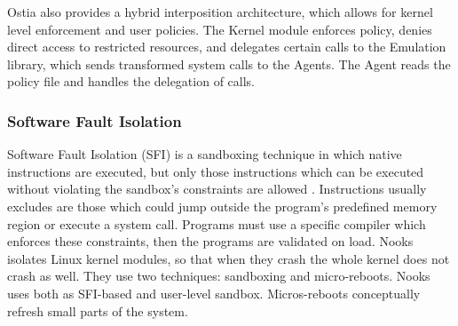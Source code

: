 Ostia also provides a hybrid interposition architecture, which allows for kernel level enforcement and user policies. 
The Kernel module enforces policy, denies direct access to restricted resources, and delegates certain calls to 
the Emulation library, which sends transformed system calls to the Agents. The Agent reads the policy file and 
handles the delegation of calls.


\subsubsection{Software Fault Isolation}

Software Fault Isolation (SFI) is a sandboxing technique in which native instructions are executed, but only those instructions 
which can be executed without violating the sandbox's constraints are allowed \cite{SFI:93}. Instructions usually excludes 
are those which could jump outside the program's predefined memory region or execute a system call. 
Programs must use a specific compiler which enforces these constraints, then the programs are validated on load. 
Nooks \cite{Nooks:03} isolates Linux kernel modules, so that when they crash the whole kernel does not crash as well. 
They use two techniques: sandboxing and micro-reboots. Nooks uses both as SFI-based and user-level sandbox. 
Micros-reboots conceptually refresh small parts of the system.
